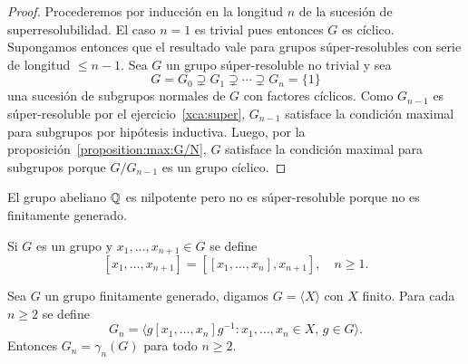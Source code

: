 \begin{proof}
	Procederemos por inducción en la longitud $n$ de la sucesión de
	superresolubilidad.  El caso $n=1$ es trivial pues entonces $G$ es cíclico.
	Supongamos entonces que el resultado vale para grupos súper-resolubles con
	serie de longitud $\leq n-1$.  Sea $G$ un grupo súper-resoluble no trivial y sea 
	\[
	G=G_0\supsetneq
	G_1\supsetneq\cdots\supsetneq G_n=\{1\}
	\]
	una sucesión de subgrupos normales de $G$ con factores cíclicos. Como
	$G_{n-1}$ es súper-resoluble por el ejercicio~\ref{xca:super},
	$G_{n-1}$ satisface la condición maximal para subgrupos por hipótesis
	inductiva.  Luego, por la proposición~\ref{proposition:max:G/N}, $G$ satisface la condición maximal para subgrupos porque
	$G/G_{n-1}$ es un grupo cíclico.
\end{proof}

%

\begin{example}
	El grupo abeliano $\mathbb{Q}$ es nilpotente pero no es súper-resoluble
	porque no es finitamente generado.
\end{example}


Si $G$ es un grupo y $x_1,\dots,x_{n+1}\in G$ se define 
\[
[x_1,\dots,x_{n+1}]=\left[ [x_1,\dots,x_n],x_{n+1} \right],\quad
n\geq1.
\]

\begin{lemma}
	\label{lemma:G_n}
	Sea $G$ un grupo finitamente generado, digamos $G=\langle X\rangle$ con $X$
	finito. Para cada $n\geq2$ se define
	\[
		G_n=\langle g[x_1,\dots,x_n]g^{-1}:x_1,\dots,x_n\in X,\,g\in G\rangle.
	\]
	Entonces $G_n=\gamma_n(G)$ para todo $n\geq2$. 
\end{lemma}

